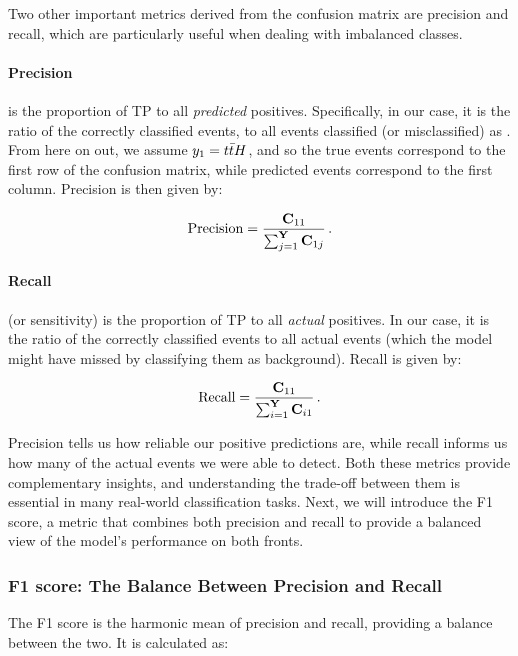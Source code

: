 Two other important metrics derived from the confusion matrix are precision and recall, which are particularly useful
when dealing with imbalanced classes.

\paragraph{Precision} is the proportion of TP to all \emph{predicted} positives. Specifically, in our case, it
is the ratio of the correctly classified \tth events, to all events classified (or misclassified) as \tth. From here on
out, we assume $y_1 = {t\bar{t}H}$, and so the true \tth events correspond to the first row of the confusion matrix, while
predicted \tth events correspond to the first column. Precision is then given by:

\begin{align}
    \text{Precision} = \frac{\mathbf{C}_{11}}{\sum_{j=1}^{\textbf{Y}} \mathbf{C}_{1j}}\,.
\end{align}

\paragraph{Recall} (or sensitivity) is the proportion of TP to all \emph{actual} positives. In our case, it is the ratio
of the correctly classified \tth events to all actual \tth events (which the model might have missed by classifying them
as background). Recall is given by:

\begin{align}
    \text{Recall} = \frac{\mathbf{C}_{11}}{\sum_{i=1}^{\textbf{Y}} \mathbf{C}_{i1}}\,.
\end{align}

Precision tells us how reliable our positive predictions are,
while recall informs us how many of the actual \tth events we were able to detect. Both these metrics provide
complementary insights, and understanding the trade-off between them is essential in many real-world classification
tasks. Next, we will introduce the F1 score, a metric that combines both precision and recall to provide a balanced view
of the model's performance on both fronts.

\subsubsection{F1 score: The Balance Between Precision and Recall}

The F1 score is the harmonic mean of precision and recall, providing a balance between the two. It is calculated as:

